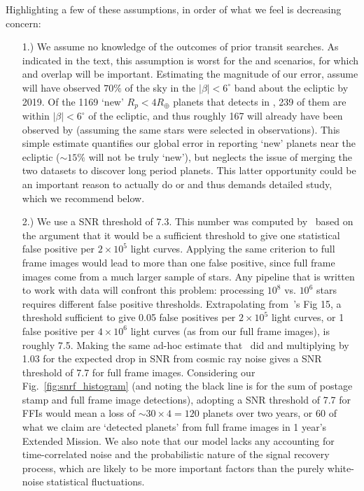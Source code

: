 Highlighting a few of these assumptions, in order of what we feel is decreasing
concern:
\begin{itemize}
\item [1.) We assume no knowledge of the outcomes of prior transit searches.]
  	As indicated in the text, this assumption is worst for the
        \elong\:and \eshort\:scenarios, for which \ktwo and \tesss
        overlap will be important.  Estimating the magnitude of our
        error, assume \ktwo will have observed $70\%$ of the sky in
        the $|\beta|<6^\circ$ band about the ecliptic by 2019.  Of the
        1169 `new' $R_p<4R_\oplus$ planets that \tess detects in
        \elong, 239 of them are within $|\beta|<6^\circ$ of the
        ecliptic, and thus roughly 167 will already have been observed by
        \ktwo (assuming the same stars were selected in \ktwo 
        observations).  
        This simple estimate quantifies our global error in reporting `new'
        planets near the ecliptic ($\sim 15\%$ will not be truly `new'), but 
        neglects the issue of merging the
        two datasets to discover long period planets.  This latter
        opportunity could be an important reason to actually do
        \elong\:or \eshort\:and thus demands detailed study, which we
        recommend below.
	    
	\item [2.) We use a SNR threshold of 7.3.] This number was computed by~ based on the argument that it would be a sufficient threshold to give one statistical false positive per $2\times10^5$ light curves.
	Applying the same criterion to full frame images would lead to more than one false positive, since full frame images come from a much larger sample of stars.
	Any pipeline that is written to work with \tess data will confront this problem:
	processing $10^8$ vs. $10^6$ stars requires different false positive thresholds.
	Extrapolating from~'s Fig 15, a threshold sufficient to give 0.05 false positives per $2\times10^5$ light curves, or 1 false positive per $4\times10^6$ light curves (as from our full frame images), is roughly 7.5.
	Making the same ad-hoc estimate that~ did and multiplying by 1.03 for the expected drop in SNR from cosmic ray noise gives a SNR threshold of 7.7 for full frame images.
	Considering our Fig.~\ref{fig:snrf_histogram} (and noting the black line is for the sum of postage stamp and full frame image detections), adopting a SNR threshold of 7.7 for FFIs would mean a loss of $\sim30\times4=120$ planets over two years, or 60 of what we claim are `detected planets' from full frame images in 1 year's Extended Mission.	 We also note that our model lacks any accounting for time-correlated noise and the probabilistic nature of the signal recovery process, which are likely to be more important factors than the purely white-noise statistical fluctuations.
	

\end{itemize}
